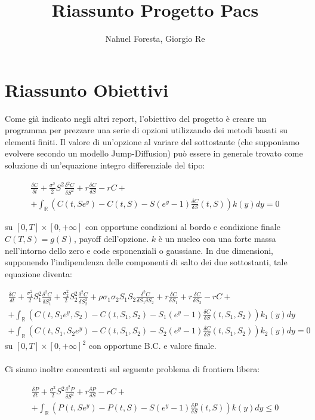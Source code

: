 \documentclass[a4paper,10pt]{article}
\title{Riassunto Progetto Pacs}
\author{Nahuel Foresta, Giorgio Re}
\newcommand{\der}[2]{\frac{\delta #1}{\delta #2}}
\newcommand{\dder}[2]{\frac{\delta^2 #1}{\delta #2^2}}
\newcommand{\dmix}[3]{\frac{\delta^2 #1}{\delta #2 \delta #3}}
\begin{document}
\maketitle

\section{Riassunto Obiettivi}

Come gi\`a indicato negli altri report, l'obiettivo del progetto è creare un programma per prezzare una serie di opzioni utilizzando dei metodi basati su elementi finiti. Il valore di un'opzione al variare del sottostante (che supponiamo evolvere secondo un modello Jump-Diffusion) può essere in generale trovato come soluzione di un'equazione integro differenziale del tipo:

\begin{multline}
\der{C}{t}+\frac{\sigma^2}{2}S^2\dder{C}{S}+r\der{C}{S}-rC+\\+ \int_\mathbb{R}\left(C(t,Se^y)-C(t,S)-S(e^y-1)\der{C}{S}(t,S)\right)k(y)dy=0
\label{eq:1d}
\end{multline}

su $[0,T]\times[0,+\infty]$ con opportune condizioni al bordo e condizione finale $C(T,S)=g(S)$, payoff dell'opzione. $k$ è un nucleo con una forte massa nell'intorno dello zero e code esponenziali o gaussiane.
In due dimensioni, supponendo l'indipendenza delle componenti di salto dei due sottostanti, tale equazione diventa:

\begin{multline}
 \der{C}{t}+\frac{\sigma_1^2}{2}S_1^2\dder{C}{S_1}+\frac{\sigma_2^2}{2}S_2^2\dder{C}{S_2}+\rho\sigma_1\sigma_2 S_1 S_2 \dmix{C}{S_1}{S_2}+
 r\der{C}{S_1}+r\der{C}{S_2}-rC+ \\
 + \int_\mathbb{R}\left(C(t,S_1e^{y},S_2)-C(t,S_1,S_2)-S_1(e^y-1)\der{C}{S}(t,S_1,S_2)\right)k_1(y)dy\\
 + \int_\mathbb{R}\left(C(t,S_1,S_2e^{y})-C(t,S_1,S_2)-S_2(e^y-1)\der{C}{S}(t,S_1,S_2)\right)k_2(y)dy=0
\label{eq:2d}
\end{multline}
su $[0,T]\times[0,+\infty]^2$ con opportune B.C. e valore finale.
\\\\
Ci siamo inoltre concentrati sul seguente problema di frontiera libera:

\begin{multline}
\der{P}{t}+\frac{\sigma^2}{2}S^2\dder{P}{S}+r\der{P}{S}-rC+\\+ \int_\mathbb{R}\left(P(t,Se^y)-P(t,S)-S(e^y-1)\der{P}{S}(t,S)\right)k(y)dy\leq0
\label{eq:usa1d}
\end{multline}
\end{document}
